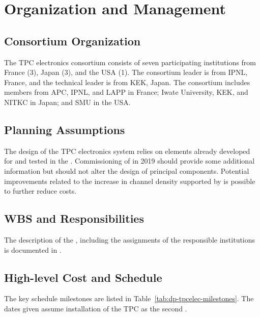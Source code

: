 \section{Organization and Management}
\label{sec:dp-tpcelec-org}


\subsection{Consortium Organization}
\label{ssec:dp-tpcelec-org-consortium}
The \dual TPC electronics consortium consists of seven participating institutions from France (\num{3}), Japan (\num{3}), and the USA (\num{1}). The consortium leader is from IPNL, France, and the technical leader is from KEK, Japan. The consortium includes members from APC, IPNL, and LAPP in France; Iwate University, KEK, and NITKC in Japan; and SMU in the USA.

\subsection{Planning Assumptions}
\label{ssec:dp-tpcelec-org-assmp}
The design of the \dual TPC electronics system relies on elements already developed for  and tested in the .  Commissioning of  in 2019 should provide some additional information but should not alter the design of principal components. Potential improvements related to the increase in channel density supported by   is possible to further reduce costs. 

\subsection{WBS and Responsibilities}
\label{ssec:dp-tpcelec-org-wbs}
The description of the , including the assignments of the responsible institutions is documented in .

\subsection{High-level Cost and Schedule}
\label{ssec:dp-tpcelec-org-cs}
The key schedule milestones are listed in Table~\ref{tab:dp-tpcelec-milestones}. The dates given assume installation of the \dual TPC as the second  .

